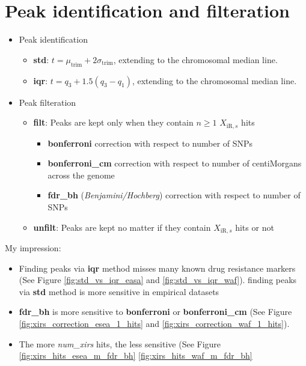 \documentclass[11pt]{article}
\begin{document}
\section {Peak identification and filteration}
\begin{itemize}[noitemsep,topsep=0pt]
	\item Peak identification
	      \begin{itemize}[noitemsep, topsep=0pt]
		      \item \textbf{std}:
		            $t = \mu_\text{trim} + 2 \sigma_\text{trim}$,
		            extending to the chromosomal median line.
		      \item \textbf{iqr}:
		            $t = q_3 + 1.5 (q_3 - q_1) $,
		            extending to the chromosomal median line.
	      \end{itemize}
	\item Peak filteration
	      \begin{itemize}[noitemsep, topsep=0pt]
		      \item \textbf{filt}:
		            Peaks are kept only when they contain $n\ge1$ $X_{\text{iR},s}$ hits
		            \begin{itemize}[noitemsep, topsep=0pt]
			            \item \textbf{bonferroni} correction
			                  with respect to number of SNPs
			            \item \textbf{bonferroni\_cm} correction
			                  with respect to number of centiMorgans across the genome
			            \item \textbf{fdr\_bh} (\textit{Benjamini/Hochberg}) correction
			                  with respect to number of SNPs
		            \end{itemize}
		      \item \textbf{unfilt}: Peaks are kept no matter if
		            they contain $X_{\text{iR},s}$ hits or not
	      \end{itemize}
\end{itemize}


My impression:
\begin{itemize}[noitemsep, topsep=0pt]
	\item Finding peaks via \textbf{iqr} method misses
	      many known drug resistance markers
	      (See Figure \ref{fig:std_vs_iqr_easa} and \ref{fig:std_vs_iqr_waf}).
	      finding peaks via \textbf{std} method is more sensitive in empirical datasets
	\item \textbf{fdr\_bh} is more sensitive to \textbf{bonferroni} or \textbf{bonferroni\_cm}
	      (See Figure \ref{fig:xirs_correction_esea_1_hits} and
	      \ref{fig:xirs_correction_waf_1_hits}).
	\item The more \textit{num\_xirs} hits, the less sensitive
	      (See Figure \ref{fig:xirs_hits_esea_m_fdr_bh}
	      \ref{fig:xirs_hits_waf_m_fdr_bh}
\end{itemize}
\end{document}
